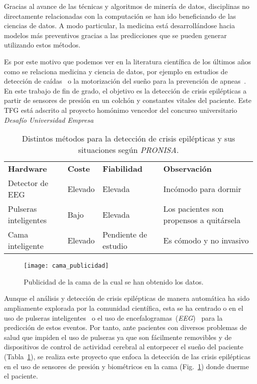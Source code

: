 
Gracias al avance de las técnicas y algoritmos de minería de datos, disciplinas no directamente relacionadas con la computación se han ido beneficiando de las ciencias de datos. A modo particular, la medicina está desarrollándose hacia modelos más preventivos gracias a las predicciones que se pueden generar utilizando estos métodos.

Es por este motivo que podemos ver en la literatura científica de los últimos años como se relaciona medicina y ciencia de datos, por ejemplo en estudios de detección de caídas~\cite{tolkiehn2011fall} o la motorización del sueño para la prevención de apneas~\cite{kortelainen2012sleepmonitoring}. En este trabajo de fin de grado, el objetivo es la detección de crisis epilépticas a partir de sensores de presión en un colchón y constantes vitales del paciente. Este TFG está adscrito al proyecto homónimo vencedor del concurso universitario \textit{Desafío Universidad Empresa}~\cite{radio:radio_amiga_burgos_2018}

\begin{table}
	\centering
	\resizebox{\textwidth}{!}
	{\begin{tabular}{llll}
			\toprule
			\textbf{Hardware} & \textbf{Coste} & \textbf{Fiabilidad} & \textbf{Observación} \\ 
			\otoprule 
			Detector de EEG & Elevado & Elevada & Incómodo para dormir \\ 
			Pulseras inteligentes & Bajo & Elevada & Los pacientes son propensos a quitársela \\ 
			Cama inteligente & Elevado & Pendiente de estudio & Es cómodo y no invasivo \\ 
			\bottomrule
	\end{tabular}}
	\caption{Distintos métodos para la detección de crisis epilépticas y sus situaciones según \textit{PRONISA}.}
	\label{tab:modelos}
\end{table}

\begin{figure}
	\centering
	\texttt{[image: cama\_publicidad]}
	\caption{Publicidad de la cama de la cual se han obtenido los datos.}
	\label{fig:cama_publi}
\end{figure}

Aunque el análisis y detección de crisis epilépticas de manera automática ha sido ampliamente explorada por la comunidad científica, esta se ha centrado o en el uso de pulseras inteligentes~\cite{ramgopal2014product_review} o el uso de encefalogramas~(\textit{EEG})~\cite{jeppesen2017modified,kumar2014epilepticeeg,tzallas2012review} para la predicción de estos eventos. Por tanto, ante pacientes con diversos problemas de salud que impiden el uso de pulseras ya que son fácilmente removibles y de dispositivos de control de actividad cerebral al entorpecer el sueño del paciente (Tabla~\ref{tab:modelos}), se realiza este proyecto que enfoca la detección de las crisis epilépticas en el uso de sensores de presión y biométricos en la cama (Fig.~\ref{fig:cama_publi}) donde duerme el paciente. 



